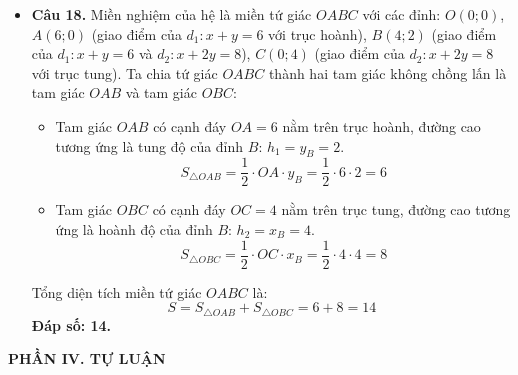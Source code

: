 \documentclass[12pt,a4paper]{article}
\begin{document}
\begin{itemize}[leftmargin=0.6cm, itemsep=4pt]
\item \textbf{Câu 18.} Miền nghiệm của hệ là miền tứ giác $OABC$ với các đỉnh:
$O(0; 0)$, $A(6; 0)$ (giao điểm của $d_1: x + y = 6$ với trục hoành), $B(4; 2)$ (giao điểm của $d_1: x + y = 6$ và $d_2: x + 2y = 8$), $C(0; 4)$ (giao điểm của $d_2: x + 2y = 8$ với trục tung).
Ta chia tứ giác $OABC$ thành hai tam giác không chồng lấn là tam giác $OAB$ và tam giác $OBC$:
\begin{itemize}
    \item Tam giác $OAB$ có cạnh đáy $OA = 6$ nằm trên trục hoành, đường cao tương ứng là tung độ của đỉnh $B$: $h_1 = y_B = 2$.
    $$S_{\triangle OAB} = \dfrac{1}{2} \cdot OA \cdot y_B = \dfrac{1}{2} \cdot 6 \cdot 2 = 6$$
    \item Tam giác $OBC$ có cạnh đáy $OC = 4$ nằm trên trục tung, đường cao tương ứng là hoành độ của đỉnh $B$: $h_2 = x_B = 4$.
    $$S_{\triangle OBC} = \dfrac{1}{2} \cdot OC \cdot x_B = \dfrac{1}{2} \cdot 4 \cdot 4 = 8$$
\end{itemize}
Tổng diện tích miền tứ giác $OABC$ là:
$$S = S_{\triangle OAB} + S_{\triangle OBC} = 6 + 8 = 14$$
\textbf{Đáp số: 14.}
\end{itemize}

\vspace{0.3cm}
\textbf{\large PHẦN IV. TỰ LUẬN}
\end{document}
